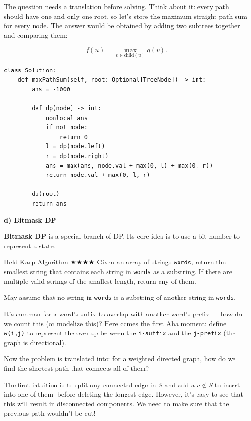 \documentclass{article}
\begin{document}
The question needs a translation before solving. Think about it: every path should have one and only one root, so let's store the maximum straight path sum for every node. The answer would be obtained by adding two subtrees together and comparing them:

$$f(u) = \max_{v \in \text{child}(u)} g(v).$$

\begin{lstlisting}[style=python]
class Solution:
    def maxPathSum(self, root: Optional[TreeNode]) -> int:
        ans = -1000 
        
        def dp(node) -> int:
            nonlocal ans
            if not node:
                return 0
            l = dp(node.left)
            r = dp(node.right)
            ans = max(ans, node.val + max(0, l) + max(0, r))
            return node.val + max(0, l, r)
            
        dp(root)
        return ans
\end{lstlisting}

\textbf{d) Bitmask DP}

\textbf{Bitmask DP} is a special branch of DP. Its core idea is to use a bit number to represent a state.

\begin{Question}{Held-Karp Algorithm
 $\bigstar$$\bigstar$$\bigstar$$\bigstar$}
Given an array of strings \texttt{words}, return the smallest string that contains each string in \texttt{words} as a substring. If there are multiple valid strings of the smallest length, return any of them.

May assume that no string in \texttt{words} is a substring of another string in \texttt{words}.
\end{Question}

It's common for a word's suffix to overlap with another word's prefix --- how do we count this (or modelize this)? Here comes the first Aha moment: define \texttt{w(i,j)} to represent the overlap between the \texttt{i-suffix} and the \texttt{j-prefix} (the graph is directional).

Now the problem is translated into: for a weighted directed graph, how do we find the shortest path that connects all of them?

The first intuition is to split any connected edge in $S$ and add a $v\notin S$ to insert into one of them, before deleting the longest edge. However, it's easy to see that this will result in disconnected components. We need to make sure that the previous path wouldn't be cut!
\end{document}
